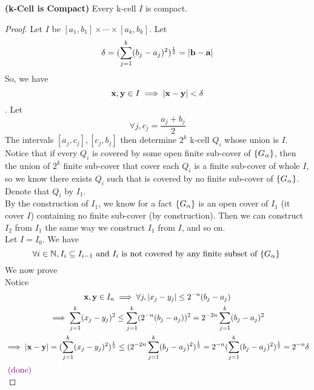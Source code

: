 \documentclass{report}
\begin{document}
\begin{theorem}
\label{2.8.9}
\textbf{(k-Cell is Compact)} Every k-cell $I$ is compact.
\end{theorem}
\begin{proof}
Let $I$ be $[a_1,b_1]\times \cdots \times [a_k,b_k]$. Let
\begin{equation}
\delta=(\sum_{j=1}^k (b_j-a_j)^2)^{\frac{1}{2}}=|\textbf{b}-\textbf{a}|
\end{equation}
So, we have
\begin{equation}
\textbf{x},\textbf{y}\in I\implies |\textbf{x}-\textbf{y}|<\delta
\end{equation}
. Let
\begin{equation}
\forall j, c_j=\frac{a_j+b_j}{2}
\end{equation}
The intervals $[a_j,c_j],[c_j,b_j]$ then determine $2^k$ k-cell $Q_i$ whose union is $I$. Notice that if every $Q_i$ is covered by some open finite sub-cover of $\{ G_\alpha  \}$, then the union of $2^k$ finite sub-cover that cover each $Q_i$ is a finite sub-cover of whole  $I$, so we know there exists  $Q_i$ such that is covered by no finite sub-cover  of $\{ G_\alpha  \}$. Denote that $Q_i$ by $I_1$.\\

By the construction of $I_1$, we know for a fact $\{ G_\alpha  \}$ is an open cover of $I_1$ (it cover $I$) containing no finite sub-cover (by construction). Then we can construct $I_2$ from  $I_1$ the same way we construct $I_1$ from  $I$, and so on.\\
 
Let $I=I_0$. We have 
\begin{equation}
\forall i\in\mathbb{N}, I_i\subseteq I_{i-1}\text{ and $I_i$ is not covered by any finite subset of  $\{ G_\alpha  \}$ }
\end{equation}
We now prove \\

Notice
\begin{gather}
\textbf{x},\textbf{y}\in I_n\implies \forall j, |x_j-y_j|\leq 2^{-n}(b_j-a_j)\\
\implies \sum_{j=1}^k (x_j-y_j)^2 \leq \sum_{j=1}^k (2^{-n}(b_j-a_j))^2=2^{-2n}\sum_{j=1}^k (b_j-a_j)^2\\
\implies |\textbf{x}-\textbf{y}|=(\sum_{j=1}^k (x_j-y_j)^2)^{\frac{1}{2}}\leq (2^{-2n}\sum _{j=1}^k (b_j-a_j)^2)^{\frac{1}{2}}=2^{-n}(\sum _{j=1}^k(b_j-a_j)^2)^{\frac{1}{2}}=2^{-n}\delta
\end{gather}
$\textcolor{violet}{\text{ (done) }}$\\


\end{proof}
\end{document}
